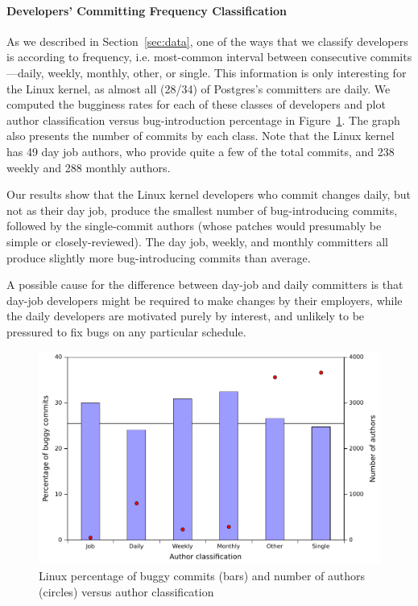 \paragraph{Developers' Committing Frequency Classification} 
As we described in Section~\ref{sec:data}, one of the ways that we
classify developers is according to frequency, i.e. most-common
interval between consecutive commits---daily, weekly, monthly, other,
or single.  This information is only interesting for the Linux kernel,
as almost all (28/34) of Postgres's committers are daily. We computed
the bugginess rates for each of these classes of developers and plot
author classification versus bug-introduction percentage in
Figure~\ref{fig-linux-bugginess-author-class}. The graph also presents
the number of commits by each class. Note that the Linux kernel has 49
day job authors, who provide quite a few of the total commits, and 238
weekly and 288 monthly authors.

Our results show that the Linux kernel developers who commit changes daily, but
not as their day job, produce the smallest number of bug-introducing
commits, followed by the single-commit authors (whose patches would
presumably be simple or closely-reviewed). The day job, weekly, and
monthly committers all produce slightly more bug-introducing commits
than average.

A possible cause for the difference between day-job and daily
committers is that day-job developers might be required to make
changes by their employers, while the daily developers are motivated
purely by interest, and unlikely to be pressured to fix bugs on any
particular schedule.

\begin{figure}
\begin{center}
\includegraphics[width=\columnwidth]{linux-bugginess-author-class.pdf}
\end{center}
\caption{Linux percentage of buggy commits (bars) and number of authors (circles) versus author classification}
\label{fig-linux-bugginess-author-class}
\end{figure}

